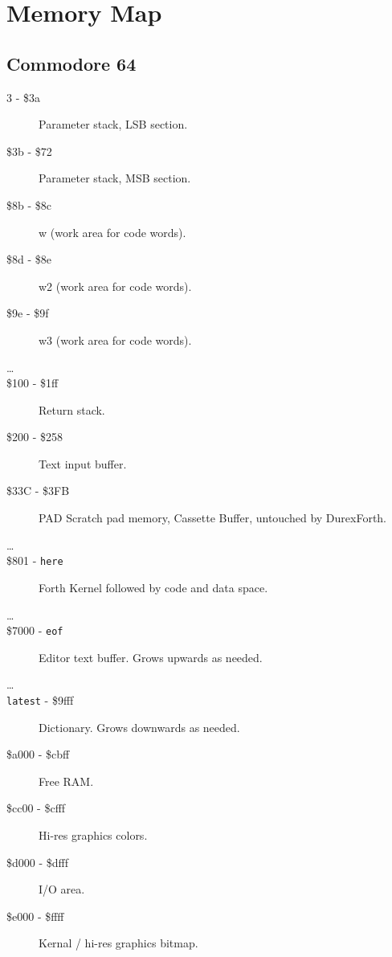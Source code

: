 \chapter{Memory Map}

\section{Commodore 64}
\begin{description}
\item[3 - \$3a] Parameter stack, LSB section.
\item[\$3b - \$72] Parameter stack, MSB section.
\item[\$8b - \$8c] w (work area for code words).
\item[\$8d - \$8e] w2 (work area for code words).
\item[\$9e - \$9f] w3 (work area for code words).
\item[\ldots]
\item[\$100 - \$1ff] Return stack.
\item[\$200 - \$258] Text input buffer.
\item[\$33C - \$3FB] PAD Scratch pad memory, Cassette Buffer, untouched by DurexForth. 
\item[\ldots]
\item[\$801 - \texttt{here}] Forth Kernel followed by code and data space.
\item[\ldots]
\item[\$7000 - \texttt{eof}] Editor text buffer. Grows upwards as needed.
\item[\ldots]
\item[\texttt{latest} - \$9fff] Dictionary. Grows downwards as needed.
\item[\$a000 - \$cbff] Free RAM.
\item[\$cc00 - \$cfff] Hi-res graphics colors.
\item[\$d000 - \$dfff] I/O area. 
\item[\$e000 - \$ffff] Kernal / hi-res graphics bitmap.
\end{description}


